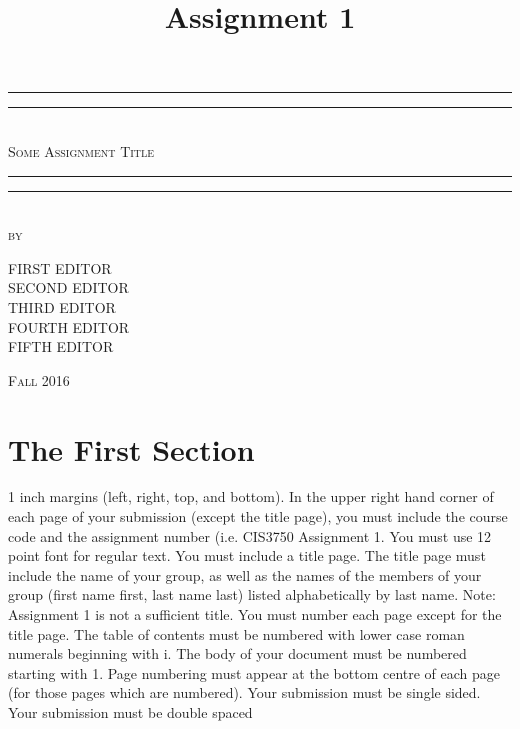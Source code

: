 \documentclass[12pt,letterpaper]{article}
\title{Assignment 1}
\begin{document}
\begin{titlepage}
    \centering
    \vspace*{\baselineskip}
    \rule{\textwidth}{1.6pt}\vspace*{-\baselineskip}\vspace*{2pt}
    \rule{\textwidth}{0.4pt}\\[1.5\baselineskip]
    {\LARGE \textsc{Some Assignment Title}}\\[\baselineskip]
	\rule{\textwidth}{0.4pt}\vspace*{-\baselineskip}\vspace{4pt}    
    \rule{\textwidth}{2pt}\\[2\baselineskip]
   
    \vspace*{7\baselineskip}
    \textsc{by}\\[0.25\baselineskip]
    
    {\scshape FIRST EDITOR \\ SECOND EDITOR \\ THIRD EDITOR \\ FOURTH EDITOR \\ FIFTH EDITOR \par}
    \vfill
    {\scshape Fall 2016} \\   
  \end{titlepage}
  
  
\tableofcontents
\lhead{} %
\clearpage
{} %
    
\section{The First Section}
1 inch margins (left, right, top, and bottom). In the upper right
hand corner of each page of your submission (except the title page), you must
include the course code and the assignment number (i.e. CIS3750 Assignment
1. You must use 12 point font for regular text. You must include a title page.
The title page must include the name of your group, as well as the names of
the members of your group (first name first, last name last) listed alphabetically
by last name. Note: Assignment 1 is not a sufficient title. You must number
each page except for the title page. The table of contents must be numbered
with lower case roman numerals beginning with i. The body of your document
must be numbered starting with 1. Page numbering must appear at the bottom
centre of each page (for those pages which are numbered). Your submission
must be single sided. Your submission must be double spaced
\end{document}
